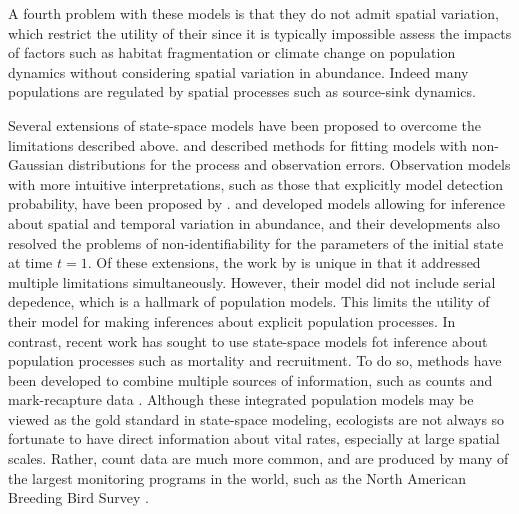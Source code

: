 \documentclass[12pt]{article}
\begin{document}
A fourth problem with these models is that they do not admit
spatial variation, which
restrict the utility of their since it is typically
impossible assess the impacts of factors such as habitat
fragmentation or climate change on population dynamics without
considering spatial variation in abundance. Indeed many populations are
regulated by spatial processes such as source-sink dynamics.

Several extensions of state-space models have been proposed to
overcome the limitations described
above. \citet{devalpine_hastings:2002} and \citet{kery_etal:2009}
described methods for fitting models with non-Gaussian distributions
for the process and observation errors. Observation models with more
intuitive interpretations, such as those that explicitly model
detection probability, have been proposed by
\citet{kery_etal:2009}. \citet{lele_etal:1998} and
\citet{kery_etal:2009} developed models allowing for inference about
spatial and temporal variation in abundance, and their developments
also resolved the problems of non-identifiability for the parameters
of the initial state at time $t=1$. Of these extensions, the work by
\citet{kery_etal:2009} is unique in that it addressed multiple limitations
simultaneously. However, their model did not include serial
depedence, which is a hallmark of population models. This limits the
utility of their model for making inferences about explicit population
processes. In contrast, recent work has sought to use state-space
models fot inference about population processes such as mortality and
recruitment. To do so, methods have been developed to combine multiple
sources of information, such as counts and mark-recapture data
\citep{besbeas_etal:2002, buckland_etal:2004,
  schaub_etal:2007}. Although these integrated
population models may be viewed as the gold standard in state-space
modeling, ecologists are not always so fortunate to have direct
information about vital rates, especially at large spatial scales.
Rather, count data are much more common, and
are produced by many of the largest monitoring programs in the world,
such as the North American Breeding Bird Survey
\citep[BBS;][]{robbins_etal:1986}.
\end{document}
